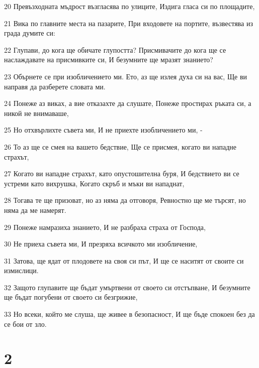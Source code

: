 \par 20 Превъзходната мъдрост възгласява по улиците, Издига гласа си по площадите,
\par 21 Вика по главните места на пазарите, При входовете на портите, възвестява из града думите си:
\par 22 Глупави, до кога ще обичате глупостта? Присмивачите до кога ще се наслаждавате на присмивките си, И безумните ще мразят знанието?
\par 23 Обърнете се при изобличението ми. Ето, аз ще излея духа си на вас, Ще ви направя да разберете словата ми.
\par 24 Понеже аз виках, а вие отказахте да слушате, Понеже простирах ръката си, а никой не внимаваше,
\par 25 Но отхвърлихте съвета ми, И не приехте изобличението ми, -
\par 26 То аз ще се смея на вашето бедствие, Ще се присмея, когато ви нападне страхът,
\par 27 Когато ви нападне страхът, като опустошителна буря, И бедствието ви се устреми като вихрушка, Когато скръб и мъки ви нападнат,
\par 28 Тогава те ще призоват, но аз няма да отговоря, Ревностно ще ме търсят, но няма да ме намерят.
\par 29 Понеже намразиха знанието, И не разбраха страха от Господа,
\par 30 Не приеха съвета ми, И презряха всичкото ми изобличение,
\par 31 Затова, ще ядат от плодовете на своя си път, И ще се наситят от своите си измислици.
\par 32 Защото глупавите ще бъдат умъртвени от своето си отстъпване, И безумните ще бъдат погубени от своето си безгрижие,
\par 33 Но всеки, който ме слуша, ще живее в безопасност, И ще бъде спокоен без да се бои от зло.

\chapter{2}

